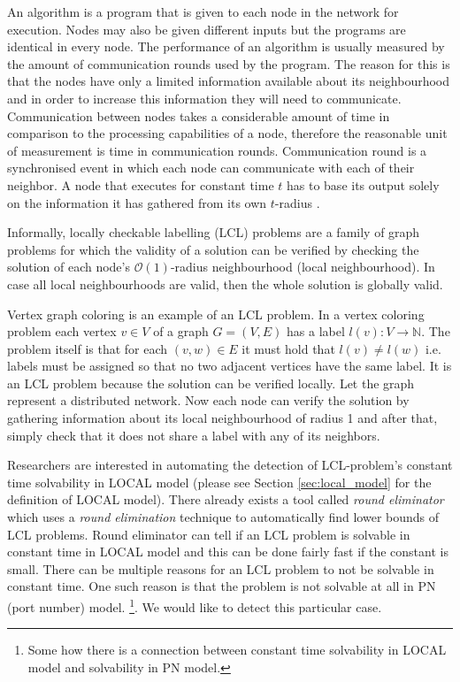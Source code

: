 An algorithm is a program that is given to each node in the network for execution.
Nodes may also be given different inputs but the programs are identical in every node.
The performance of an algorithm is usually measured by the amount of communication rounds used by the program.
The reason for this is that the nodes have only a limited information available about its neighbourhood and in order to increase this information they will need to communicate.
Communication between nodes takes a considerable amount of time in comparison to the processing capabilities of a node, therefore the reasonable unit of measurement is time in communication rounds.
Communication round is a synchronised event in which each node can communicate with each of their neighbor.
A node that executes for constant time $t$ has to base its output solely on the information it has gathered from its own $t$-radius
\cite{DBLP:journals/siamcomp/NaorS95}.

Informally, locally checkable labelling (LCL) problems are a family of graph problems for which the validity of a solution can be verified by checking the solution of each node's $\mathcal{O}(1)$-radius neighbourhood (local neighbourhood).
In case all local neighbourhoods are valid, then the whole solution is globally valid.
\cite{DBLP:conf/podc/BrandtHKLOPRSU17}

Vertex graph coloring is an example of an LCL problem.
In a vertex coloring problem each vertex $v \in V$ of a graph $G = (V, E)$ has a label $l(v): V \rightarrow \mathbb{N}$.
The problem itself is that for each $(v, w) \in E$ it must hold that $l(v) \neq l(w)$ i.e. labels must be assigned so that no two adjacent vertices have the same label.
It is an LCL problem because the solution can be verified locally.
Let the graph represent a distributed network.
Now each node can verify the solution by gathering information about its local neighbourhood of radius 1 and after that, simply check that it does not share a label with any of its neighbors.

Researchers are interested in automating the detection of LCL-problem's constant time solvability in LOCAL model (please see Section \ref{sec:local_model} for the definition of LOCAL model).
There already exists a tool called \emph{round eliminator} \cite{DBLP:conf/podc/Olivetti20} which uses a \emph{round elimination} \cite{DBLP:conf/podc/Brandt19} technique to automatically find lower bounds of LCL problems.
Round eliminator can tell if an LCL problem is solvable in constant time in LOCAL model and this can be done fairly fast if the constant is small.%
There can be multiple reasons for an LCL problem to not be solvable in constant time.
One such reason is that the problem is not solvable at all in PN (port number) model.
\footnote{Some how there is a connection between constant time solvability in LOCAL model and solvability in PN model.}.
We would like to detect this particular case.


